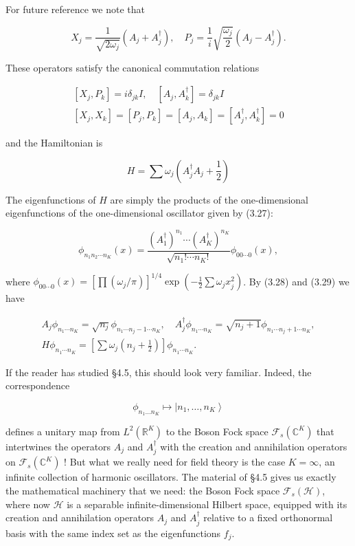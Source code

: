 \documentclass[10pt, letterpaper]{article}
\begin{document}
For future reference we note that

$$
X_{j}=\frac{1}{\sqrt{2 \omega_{j}}}\left(A_{j}+A_{j}^{\dagger}\right), \quad P_{j}=\frac{1}{i} \sqrt{\frac{\omega_{j}}{2}}\left(A_{j}-A_{j}^{\dagger}\right) .
$$

These operators satisfy the canonical commutation relations

$$
\begin{gathered}
{\left[X_{j}, P_{k}\right]=i \delta_{j k} I, \quad\left[A_{j}, A_{k}^{\dagger}\right]=\delta_{j k} I} \\
{\left[X_{j}, X_{k}\right]=\left[P_{j}, P_{k}\right]=\left[A_{j}, A_{k}\right]=\left[A_{j}^{\dagger}, A_{k}^{\dagger}\right]=0}
\end{gathered}
$$

and the Hamiltonian is

$$
H=\sum \omega_{j}\left(A_{j}^{\dagger} A_{j}+\frac{1}{2}\right)
$$

The eigenfunctions of $H$ are simply the products of the one-dimensional eigenfunctions of the one-dimensional oscillator given by (3.27):

$$
\phi_{n_{1} n_{2} \cdots n_{K}}(x)=\frac{\left(A_{1}^{\dagger}\right)^{n_{1}} \cdots\left(A_{K}^{\dagger}\right)^{n_{K}}}{\sqrt{n_{1}!\cdots n_{K}!}} \phi_{00 \cdots 0}(x),
$$

where $\phi_{00 \cdots 0}(x)=\left[\prod\left(\omega_{j} / \pi\right)\right]^{1 / 4} \exp \left(-\frac{1}{2} \sum \omega_{j} x_{j}^{2}\right)$. By (3.28) and (3.29) we have

$$
\begin{gathered}
A_{j} \phi_{n_{1} \cdots n_{K}}=\sqrt{n_{j}} \phi_{n_{1} \cdots n_{j}-1 \cdots n_{K}}, \quad A_{j}^{\dagger} \phi_{n_{1} \cdots n_{K}}=\sqrt{n_{j}+1} \phi_{n_{1} \cdots n_{j}+1 \cdots n_{K}}, \\
H \phi_{n_{1} \cdots n_{K}}=\left[\sum \omega_{j}\left(n_{j}+\frac{1}{2}\right)\right] \phi_{n_{1} \cdots n_{K}} .
\end{gathered}
$$

If the reader has studied §4.5, this should look very familiar. Indeed, the correspondence

$$
\phi_{n_{1} \ldots n_{K}} \mapsto\left|n_{1}, \ldots, n_{K}\right\rangle
$$

defines a unitary map from $L^{2}\left(\mathbb{R}^{K}\right)$ to the Boson Fock space $\mathcal{F}_{s}\left(\mathbb{C}^{K}\right)$ that intertwines the operators $A_{j}$ and $A_{j}^{\dagger}$ with the creation and annihilation operators on $\mathcal{F}_{s}\left(\mathbb{C}^{K}\right)$ ! But what we really need for field theory is the case $K=\infty$, an infinite collection of harmonic oscillators. The material of §4.5 gives us exactly the mathematical machinery that we need: the Boson Fock space $\mathcal{F}_{s}(\mathcal{H})$, where now $\mathcal{H}$ is a separable infinite-dimensional Hilbert space, equipped with its creation and annihilation operators $A_{j}$ and $A_{j}^{\dagger}$ relative to a fixed orthonormal basis with the same index set as the eigenfunctions $f_{j}$.
\end{document}
